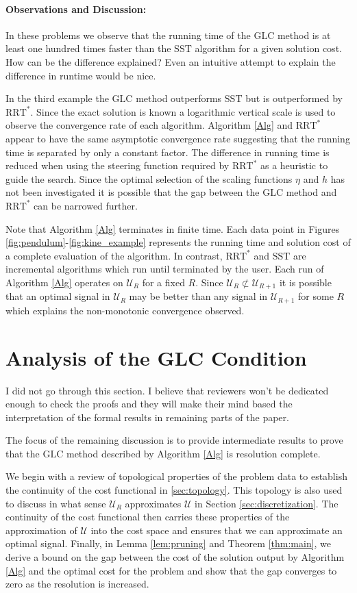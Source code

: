 \documentclass{llncs}
\newcommand{\GLC}{\ensuremath{\mathrm{GLC}}\xspace}
\newcommand{\RRTs}{\ensuremath{\mathrm{RRT}^*}\xspace}
\newcommand{\SST}{\ensuremath{\mathrm{SST}}\xspace}
\newcommand{\mcmargin}[2]{{\color{red}#1}\marginpar{\raggedright\footnotesize\color{red}[MC] #2}}
\begin{document}
\paragraph{Observations and Discussion:}
%
In these problems we observe that the running time of the \GLC method is at least one hundred times faster than the \SST algorithm for a given solution cost. \mcmargin{How can be the difference explained? Even an intuitive attempt to explain the difference in runtime would be nice.}{}

In the third example the \GLC method outperforms \SST but is outperformed by \RRTs. Since the exact solution is known a logarithmic vertical scale is used to observe the convergence rate of each algorithm. Algorithm \ref{Alg} and \RRTs appear to have the same asymptotic convergence rate suggesting that the running time is separated by only a constant factor. 
%
The difference in running time is reduced when using the steering function required by \RRTs as a heuristic to guide the search. 
%
Since the optimal selection of the scaling functions $\eta$ and $h$ has not been investigated it is possible that the gap between the \GLC method and \RRTs can be narrowed further.
%

Note that Algorithm \ref{Alg} terminates in finite time.
%
Each data point in Figures \ref{fig:pendulum}-\ref{fig:kine_example} represents the running time and solution cost of a complete evaluation of the algorithm. 
%
In contrast, \RRTs and \SST are incremental algorithms which run until terminated by the user. 
%	
Each run of Algorithm \ref{Alg} operates on $\mathcal{U}_R$ for a fixed $R$. Since $\mathcal{U}_{R}\not\subset\mathcal{U}_{R+1}$ it is possible that an optimal signal in $\mathcal{U}_R$ may be better than any signal in $\mathcal{U}_{R+1}$ for some $R$ which explains the non-monotonic convergence observed.
%
\section{\label{sec:Justification}Analysis of the GLC Condition}
\mcmargin{I did not go through this section. I believe that reviewers won't be dedicated enough to check the proofs and they will make their mind based the interpretation of the formal results in remaining parts of the paper.}{}

The focus of the remaining discussion is to provide intermediate results to prove that the \GLC method described by Algorithm \ref{Alg} is resolution complete.

We begin with a review of topological properties of the problem data to establish the continuity of the cost functional in \ref{sec:topology}. 
%
This topology is also used to discuss in what sense $\mathcal{U}_R$ approximates $\mathcal{U}$ in Section \ref{sec:discretization}. 
%
The continuity of the cost functional then carries these properties of the approximation of $\mathcal{U}$ into the cost space and ensures that we can approximate an optimal signal. 
%
Finally,  in Lemma \ref{lem:pruning} and Theorem \ref{thm:main}, we derive a bound on the gap between the cost of the solution output by Algorithm \ref{Alg} and the optimal cost for the problem and show that the gap converges to zero as the resolution is increased.
\end{document}
